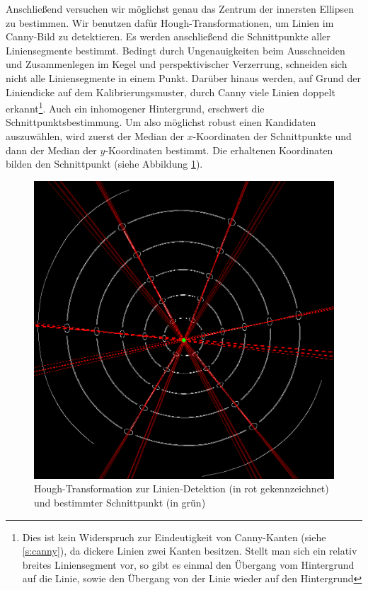 Anschließend versuchen wir möglichst genau das Zentrum der innersten Ellipsen zu bestimmen.
Wir benutzen dafür Hough-Transformationen, um Linien im Canny-Bild zu detektieren.
Es werden anschließend die Schnittpunkte aller Liniensegmente bestimmt. Bedingt durch Ungenauigkeiten beim Ausschneiden und Zusammenlegen im Kegel und perspektivischer Verzerrung, schneiden sich nicht alle Liniensegmente in einem Punkt.
Darüber hinaus werden, auf Grund der Liniendicke auf dem Kalibrierungsmuster, durch Canny viele Linien doppelt erkannt\footnote{Dies ist kein Widerspruch zur Eindeutigkeit von Canny-Kanten (siehe \ref{s:canny}), da dickere Linien zwei Kanten besitzen. Stellt man sich ein relativ breites Liniensegment vor, so gibt es einmal den Übergang vom Hintergrund auf die Linie, sowie den Übergang von der Linie wieder auf den Hintergrund}. Auch ein inhomogener Hintergrund, erschwert die Schnittpunktsbestimmung. Um also möglichst robust einen Kandidaten auszuwählen, wird zuerst der Median der $x$-Koordinaten der Schnittpunkte und dann der Median der $y$-Koordinaten bestimmt. Die erhaltenen Koordinaten bilden den Schnittpunkt (siehe Abbildung \ref{fig:houghLines}).

\begin{figure}[!htb]
	\centering
	\includegraphics[scale=.25]{images/houghLines.png}
	\caption{Hough-Transformation zur Linien-Detektion (in rot gekennzeichnet) und bestimmter Schnittpunkt (in grün) }
	\label{fig:houghLines}
\end{figure}

